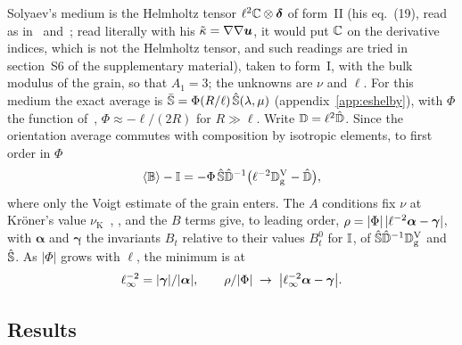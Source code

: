 Solyaev's medium is the Helmholtz tensor $\ell^2\mathbb{C}\otimes\bm{\delta}$ of form~II (his eq.~(19), read
as in~\cite[eq.~(4.3)]{Ma2018} and~\cite[eq.~(3.3)]{Gao2009}; read literally with his
$\tilde\kappa=\nabla\nabla\bm{u}$, it would put $\mathbb{C}$ on the derivative indices, which is not
the Helmholtz tensor, and such readings are tried in section~S6 of the supplementary
material), taken to form~I, with the bulk modulus of the
grain, so that $A_1=3$; the unknowns are $\nu$ and $\ell$. For this medium the exact average is
$\bar{\mathbb{S}}=\Phi(R/\ell)\,\hat{\mathbb{S}}(\lambda,\mu)$ (appendix~\ref{app:eshelby}), with
$\Phi$ the function of~\cite[eq.~(21)]{Solyaev2023}, $\Phi\approx-\ell/(2R)$ for $R\gg\ell$. Write $\mathbb{D}=\ell^2\hat{\mathbb{D}}$.
Since the orientation average commutes with composition by isotropic elements, to first
order in $\Phi$
\begin{equation}
\langle \mathbb{B}\rangle-\mathbb{I}=-\Phi\,\hat{\mathbb{S}}\hat{\mathbb{D}}^{-1}\big(\ell^{-2}\mathbb{D}_{\mathrm{g}}^{\mathrm{V}}-\hat{\mathbb{D}}\big),
\label{eq:sc-limit}
\end{equation}
where only the Voigt estimate of the grain enters. The $A$ conditions fix $\nu$ at
Kr\"oner's value $\nu_{\mathrm K}$~\cite[eq.~(3.7)]{Blaschke2017},
\cite[eq.~(16b)]{Kube2016}, and the $B$ terms give, to leading order, $\rho=|\Phi|\,|\ell^{-2}\bm\alpha-\bm\gamma|$,
with $\bm\alpha$ and $\bm\gamma$ the invariants $B_t$ relative to their values $B_t^0$ for $\mathbb{I}$, of
$\hat{\mathbb{S}}\hat{\mathbb{D}}^{-1}\mathbb{D}_{\mathrm{g}}^{\mathrm{V}}$ and $\hat{\mathbb{S}}$. As $|\Phi|$ grows with $\ell$, the
minimum is at
\begin{equation}
\ell_{\infty}^{-2}=|\bm\gamma|/|\bm\alpha|,\qquad \rho/|\Phi|\;\to\;\big|\ell_{\infty}^{-2}\bm\alpha-\bm\gamma\big|.
\label{eq:sc-linf}
\end{equation}

\subsection{Results}\label{sec:application-results}

